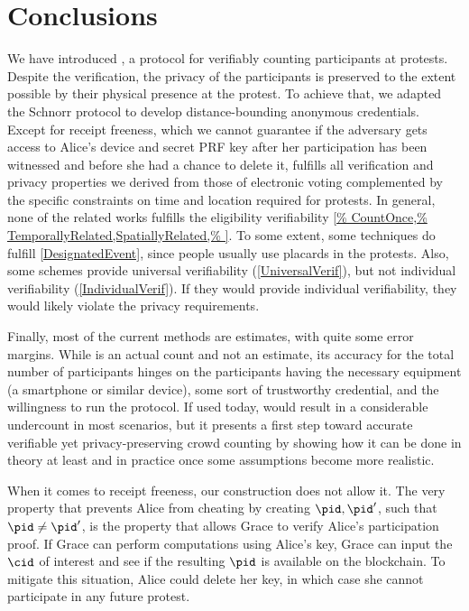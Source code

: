 \section{Conclusions}%
\label{Conclusions}

We have introduced \PRIVO, a protocol for verifiably counting
participants at protests. Despite the verification, the privacy of the
participants is preserved to the extent possible by their physical
presence at the protest. To achieve that, we adapted the Schnorr
protocol to develop distance-bounding anonymous credentials. Except for receipt
freeness, which we cannot guarantee if the adversary gets access to
Alice's device and secret PRF key after her participation has
been witnessed and before she had a chance to
delete it, \PRIVO
fulfills all verification and privacy properties we derived from those
of electronic voting complemented by the specific constraints on time
and location required for protests. 
In general, none of the related works fulfills the eligibility verifiability 
\cref{%
  CountOnce,%
  TemporallyRelated,SpatiallyRelated,%
}.
To some extent, some techniques do fulfill \cref{DesignatedEvent}, since people 
usually use placards in the protests.
Also, some schemes provide universal verifiability (\cref{UniversalVerif}), but 
not individual verifiability (\cref{IndividualVerif}).
If they would provide individual verifiability, they would likely violate the 
privacy requirements.

Finally, most of the current methods are estimates, with quite some error 
margins. While \PRIVO is an actual count and not an estimate, its
accuracy for the total number of participants hinges on the
participants having the necessary equipment (a smartphone or similar
device), some sort of trustworthy credential, and the willingness to
run the protocol. If used today, \PRIVO would result in a
considerable undercount in most scenarios,  but it presents a first
step toward accurate verifiable yet privacy-preserving crowd counting
by showing how it can be done in theory at least and in practice once
some assumptions become more realistic. 

When it comes to receipt freeness, our construction does not allow it.
The very property that prevents Alice from cheating by creating \(\pid, \pid'\), 
such that \(\pid \neq \pid'\), is the property that allows Grace to verify 
Alice's participation proof.
If Grace can perform computations using Alice's key, Grace can input the 
\(\cid\) of interest and see if the resulting \(\pid\) is available on the 
blockchain.
To mitigate this situation, Alice could delete her key, in which case she cannot 
participate in any future protest.

